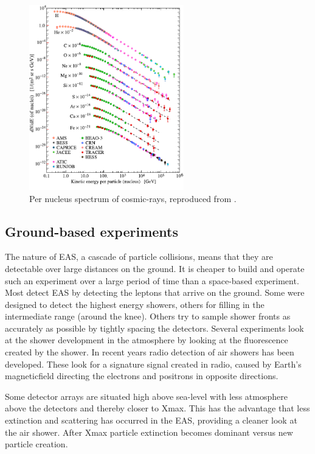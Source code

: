 \begin{figure}
    \centering
    \includegraphics[width=0.6\textwidth]
                    {plots/cosmic-rays/PDG_28_1_fluxes_per_nucleus}
    \caption{Per nucleus spectrum of cosmic-rays, reproduced from \cite{olive2014pdg}.}
    \label{fig:low_e_spectrum}
\end{figure}


\subsection{Ground-based experiments}

The nature of EAS, a cascade of particle collisions, means that they are detectable over large distances on the ground. It is cheaper to build and operate such an experiment over a large period of time than a space-based experiment. Most detect EAS by detecting the leptons that arrive on the ground. Some were designed to detect the highest energy showers, others for filling in the intermediate range (around the knee). Others try to sample shower fronts as accurately as possible by tightly spacing the detectors. Several experiments look at the shower development in the atmosphere by looking at the fluorescence created by the shower. In recent years radio detection of air showers has been developed. These look for a signature signal created in radio, caused by Earth's magneticfield directing the electrons and positrons in opposite directions.

Some detector arrays are situated high above sea-level with less atmosphere above the detectors and thereby closer to Xmax. This has the advantage that less extinction and scattering has occurred in the EAS, providing a cleaner look at the air shower. After Xmax particle extinction becomes dominant versus new particle creation.

